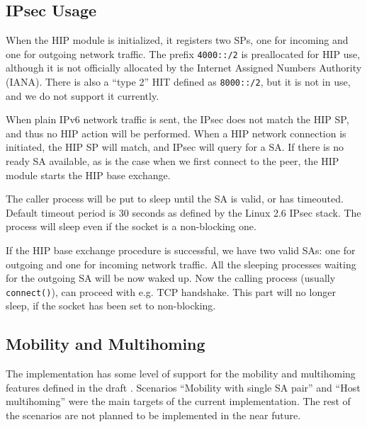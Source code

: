 \subsection{IPsec Usage}

When the \ac{HIP} module is initialized, it registers two \acp{SP},
one for incoming and one for outgoing network traffic. The prefix
\verb|4000::/2| is preallocated for \ac{HIP} use, although it is not
officially allocated by the Internet Assigned Numbers Authority
(IANA). There is also a ``type 2'' HIT defined as \verb|8000::/2|, but
it is not in use, and we do not support it currently.

When plain IPv6 network traffic is sent, the \ac{IPsec} does not match
the \ac{HIP} \ac{SP}, and thus no \ac{HIP} action will be
performed. When a \ac{HIP} network connection is initiated, the
\ac{HIP} \ac{SP} will match, and \ac{IPsec} will query for a
\ac{SA}. If there is no ready \ac{SA} available, as is the case when
we first connect to the peer, the \ac{HIP} module starts the \ac{HIP}
base exchange.

The caller process will be put to sleep until the \ac{SA} is valid, or
has timeouted.  Default timeout period is 30 seconds as defined by the
Linux 2.6 IPsec stack. The process will sleep even if the socket is
a non-blocking one.


If the \ac{HIP} base exchange procedure is successful, we have two
valid \acp{SA}: one for outgoing and one for incoming network
traffic. All the sleeping processes waiting for the outgoing \ac{SA}
will be now waked up. Now the calling process (usually
\verb|connect()|), can proceed with e.g. \ac{TCP} handshake. This part
will no longer sleep, if the socket has been set to non-blocking.

\subsection{Mobility and Multihoming}
\label{sec:mobility_and_multihoming_architecture}

The implementation has some level of support for the mobility and
multihoming features defined in the draft
\cite{hip-ietf-mm-00}. Scenarios ``Mobility with single SA pair'' and
``Host multihoming'' were the main targets of the current
implementation. The rest of the scenarios are not planned to be
implemented in the near future.


